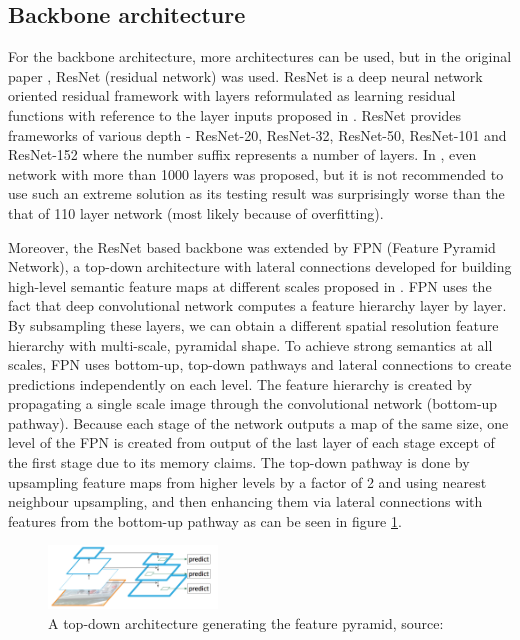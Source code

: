 \documentclass[journal, onecolumn, a4paper]{IEEEtran}
\begin{document}
\subsection{Backbone architecture}

For the backbone architecture, more architectures can be used, but in the original paper \cite{mask-rcnn}, ResNet (residual network) was used. ResNet is a deep neural network oriented residual framework with layers reformulated as learning residual functions with reference to the layer inputs proposed in \cite{resnet}. ResNet provides frameworks of various depth - ResNet-20, ResNet-32, ResNet-50, ResNet-101 and ResNet-152 where the number suffix represents a number of layers. In \cite{resnet}, even network with more than 1000 layers was proposed, but it is not recommended to use such an extreme solution as its testing result was surprisingly worse than the that of 110 layer network (most likely because of overfitting). 

Moreover, the ResNet based backbone was extended by FPN (Feature Pyramid Network), a top-down architecture with lateral connections developed for building high-level semantic feature maps at different scales proposed in \cite{fpn}. FPN uses the fact that deep convolutional network computes a feature hierarchy layer by layer. By subsampling these layers, we can obtain a different spatial resolution feature hierarchy with multi-scale, pyramidal shape. To achieve strong semantics at all scales, FPN uses bottom-up, top-down pathways and lateral connections to create predictions independently on each level. The feature hierarchy is created by propagating a single scale image through the convolutional network (bottom-up pathway). Because each stage of the network outputs a map of the same size, one level of the FPN is created from output of the last layer of each stage except of the first stage due to its memory claims. The top-down pathway is done by upsampling feature maps from higher levels by a factor of 2 and using nearest neighbour upsampling, and then enhancing them via lateral connections with features from the bottom-up pathway as can be seen in figure \ref{fig:top-down}. 

\begin{figure}[h] \centering
	\includegraphics[width=0.4\textwidth]{top-down}
	\caption{A top-down architecture generating the feature pyramid, source: \cite{fpn}}
	\label{fig:top-down}
\end{figure}
\end{document}

